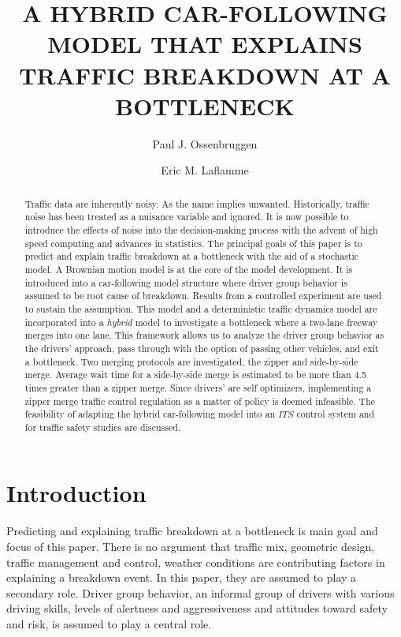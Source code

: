 \documentclass[Proceedings]{ascelike}
\begin{document}
%
\title{A HYBRID CAR-FOLLOWING MODEL THAT EXPLAINS TRAFFIC BREAKDOWN AT A BOTTLENECK}
\author[1]{Paul J. Ossenbruggen} 
\author[2]{Eric M. Laflamme}
\maketitle
\begin{abstract} Traffic data are inherently noisy. As the name implies unwanted. Historically, traffic noise has been  treated as a nuisance variable and ignored. It is now possible to introduce the effects of noise into the decision-making process with the advent of high speed computing and advances in statistics. The principal goals of this paper is to predict and explain traffic breakdown at a bottleneck with the aid of a stochastic model. A Brownian motion model is at the core of the model development. It is introduced into a car-following model structure where driver group behavior is assumed to be root cause of breakdown. Results from a controlled experiment are used to sustain the assumption. This model and a deterministic traffic dynamics model are incorporated into a \emph{hybrid} model to investigate a bottleneck where a two-lane freeway merges into one lane. This framework allows us to analyze the driver group behavior as the drivers' approach, pass through with the option of passing other vehicles, and exit a bottleneck. Two merging protocols are investigated, the zipper and side-by-side merge. Average wait time for a side-by-side merge is estimated to be more than 4.5 times greater  than  a zipper merge. Since drivers' are self optimizers, implementing a zipper merge traffic control regulation as a matter of policy is deemed infeasible. The feasibility of adapting the hybrid car-following model into an $ITS$ control system and for traffic safety studies are discussed.
\end{abstract}
%
\section{Introduction}
Predicting and explaining traffic breakdown at a bottleneck is main goal and focus of this paper. There is no argument that traffic mix, geometric design, traffic management and control, weather conditions are contributing factors in explaining a breakdown event. In this paper, they are assumed to play a secondary role. Driver group behavior,  an informal group of drivers with various driving skills, levels of alertness and aggressiveness and attitudes toward safety and risk, is assumed to play a central role. 
\end{document}
